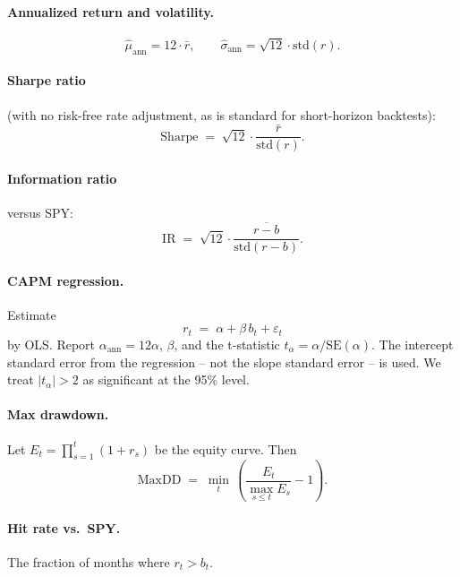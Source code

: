 \documentclass[11pt]{article}
\begin{document}
\paragraph{Annualized return and volatility.}
\begin{equation}
\hat{\mu}_{\text{ann}} = 12 \cdot \bar{r}, \qquad
\hat{\sigma}_{\text{ann}} = \sqrt{12} \cdot \mathrm{std}(r).
\end{equation}

\paragraph{Sharpe ratio} (with no risk-free rate adjustment, as is standard for
short-horizon backtests):
\begin{equation}
\text{Sharpe} \;=\; \sqrt{12} \cdot \frac{\bar{r}}{\mathrm{std}(r)}.
\end{equation}

\paragraph{Information ratio} versus SPY:
\begin{equation}
\text{IR} \;=\; \sqrt{12} \cdot \frac{\overline{r - b}}{\mathrm{std}(r-b)}.
\end{equation}

\paragraph{CAPM regression.} Estimate
\begin{equation}
r_t \;=\; \alpha + \beta\, b_t + \varepsilon_t
\end{equation}
by OLS. Report $\alpha_{\text{ann}} = 12\alpha$, $\beta$, and the t-statistic
$t_\alpha = \alpha / \mathrm{SE}(\alpha)$. The intercept standard error from the
regression -- not the slope standard error -- is used. We treat $|t_\alpha| > 2$ as
significant at the 95\% level.

\paragraph{Max drawdown.} Let $E_t = \prod_{s=1}^{t}(1+r_s)$ be the equity curve. Then
\begin{equation}
\text{MaxDD} \;=\; \min_{t}\, \left( \frac{E_t}{\max_{s \le t} E_s} - 1 \right).
\end{equation}

\paragraph{Hit rate vs.\ SPY.} The fraction of months where $r_t > b_t$.
\end{document}

